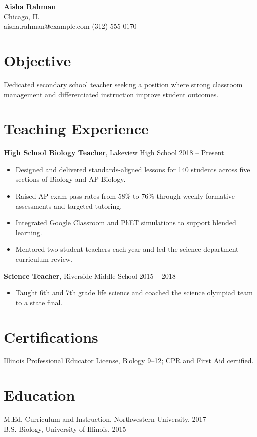 \documentclass[11pt]{article}
\begin{document}
\begin{center}
\textbf{\Large Aisha Rahman}\\[4pt]
Chicago, IL \\
aisha.rahman@example.com \quad (312) 555-0170
\end{center}
\section*{Objective}
Dedicated secondary school teacher seeking a position where strong classroom management and differentiated instruction improve student outcomes.
\section*{Teaching Experience}
\textbf{High School Biology Teacher}, Lakeview High School \hfill 2018 -- Present
\begin{itemize}
\item Designed and delivered standards-aligned lessons for 140 students across five sections of Biology and AP Biology.
\item Raised AP exam pass rates from 58\% to 76\% through weekly formative assessments and targeted tutoring.
\item Integrated Google Classroom and PhET simulations to support blended learning.
\item Mentored two student teachers each year and led the science department curriculum review.
\end{itemize}
\textbf{Science Teacher}, Riverside Middle School \hfill 2015 -- 2018
\begin{itemize}
\item Taught 6th and 7th grade life science and coached the science olympiad team to a state final.
\end{itemize}
\section*{Certifications}
Illinois Professional Educator License, Biology 9--12; CPR and First Aid certified.
\section*{Education}
M.Ed. Curriculum and Instruction, Northwestern University, 2017 \\
B.S. Biology, University of Illinois, 2015
\end{document}
